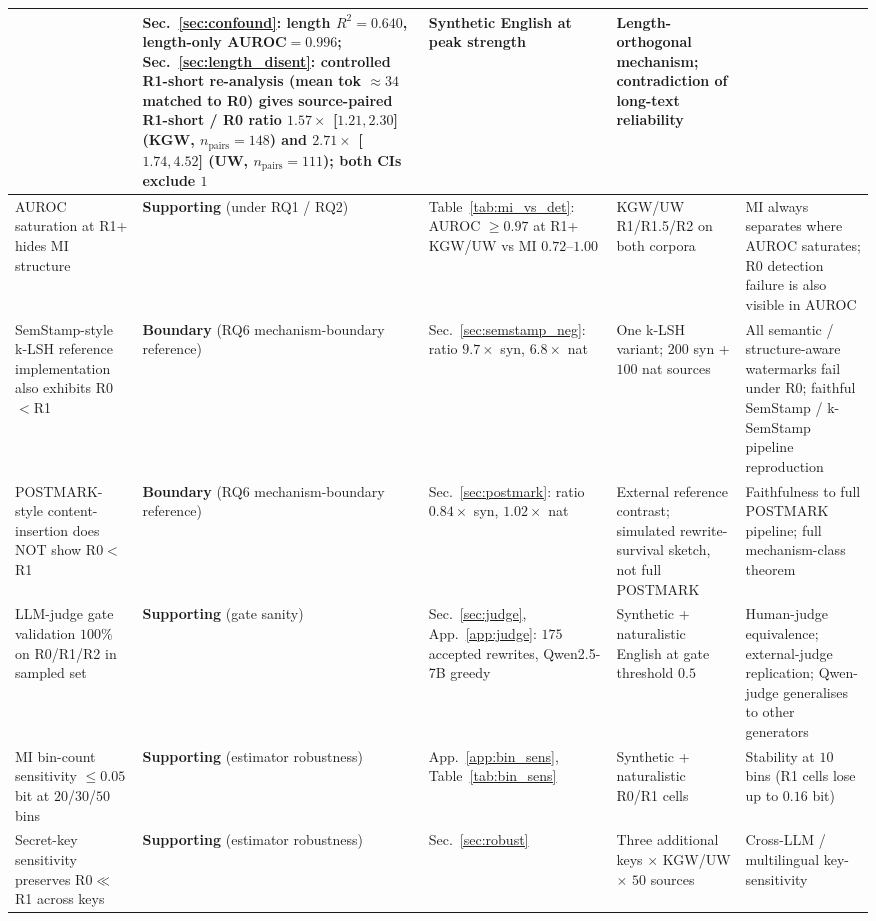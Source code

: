 \documentclass[11pt]{article}
\begin{document}
\begin{table}[h]
\begin{tabular}{p{} p{} p{} p{} p{}}
& Sec.~\ref{sec:confound}: length $R^2{=}0.640$, length-only
AUROC$=0.996$; Sec.~\ref{sec:length_disent}: controlled R1-short
re-analysis (mean tok $\approx 34$ matched to R0) gives source-paired
R1-short / R0 ratio $1.57\times$ [$1.21, 2.30$] (KGW, $n_{\mathrm{pairs}}=148$)
and $2.71\times$ [$1.74, 4.52$] (UW, $n_{\mathrm{pairs}}=111$); both CIs
exclude $1$
& Synthetic English at peak strength
& Length-orthogonal mechanism; contradiction of long-text reliability \\
\midrule
AUROC saturation at R1+ hides MI structure
& \textbf{Supporting} (under RQ1 / RQ2)
& Table~\ref{tab:mi_vs_det}: AUROC $\geq 0.97$ at R1+ KGW/UW vs MI
$0.72$--$1.00$
& KGW/UW R1/R1.5/R2 on both corpora
& MI always separates where AUROC saturates; R0 detection failure is also
visible in AUROC \\
\midrule
SemStamp-style k-LSH reference implementation also exhibits R0$<$R1
& \textbf{Boundary} (RQ6 mechanism-boundary reference)
& Sec.~\ref{sec:semstamp_neg}: ratio $9.7\times$ syn, $6.8\times$ nat
& One k-LSH variant; $200$ syn + $100$ nat sources
& All semantic / structure-aware watermarks fail under R0; faithful
SemStamp / k-SemStamp pipeline reproduction \\
\midrule
POSTMARK-style content-insertion does NOT show R0$<$R1
& \textbf{Boundary} (RQ6 mechanism-boundary reference)
& Sec.~\ref{sec:postmark}: ratio $0.84\times$ syn, $1.02\times$ nat
& External reference contrast; simulated rewrite-survival sketch, not full POSTMARK
& Faithfulness to full POSTMARK pipeline; full mechanism-class theorem \\
\midrule
LLM-judge gate validation $100\%$ on R0/R1/R2 in sampled set
& \textbf{Supporting} (gate sanity)
& Sec.~\ref{sec:judge}, App.~\ref{app:judge}: $175$ accepted rewrites,
Qwen2.5-7B greedy
& Synthetic + naturalistic English at gate threshold $0.5$
& Human-judge equivalence; external-judge replication; Qwen-judge generalises
to other generators \\
\midrule
MI bin-count sensitivity $\leq 0.05$ bit at $20$/$30$/$50$ bins
& \textbf{Supporting} (estimator robustness)
& App.~\ref{app:bin_sens}, Table~\ref{tab:bin_sens}
& Synthetic + naturalistic R0/R1 cells
& Stability at $10$ bins (R1 cells lose up to $0.16$ bit) \\
\midrule
Secret-key sensitivity preserves R0$\ll$R1 across keys
& \textbf{Supporting} (estimator robustness)
& Sec.~\ref{sec:robust}
& Three additional keys $\times$ KGW/UW $\times$ $50$ sources
& Cross-LLM / multilingual key-sensitivity \\
\bottomrule
\end{tabular}
\end{table}
\end{document}
